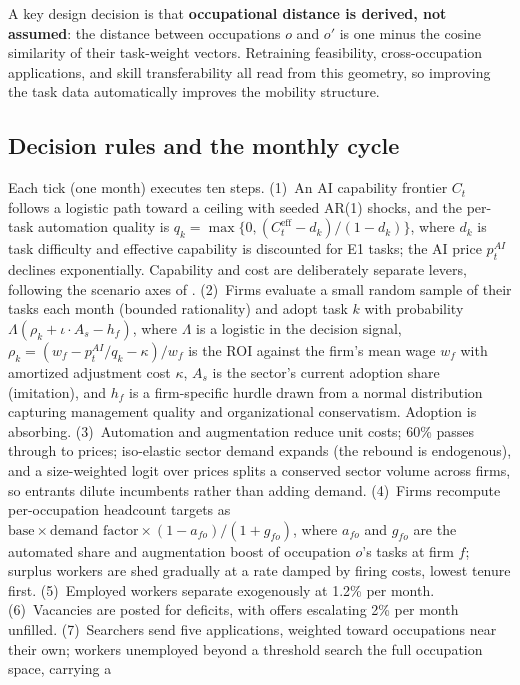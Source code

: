 \documentclass[11pt,a4paper]{article}
\begin{document}
A key design decision is that \textbf{occupational distance is derived, not assumed}:
the distance between occupations $o$ and $o'$ is one minus the cosine similarity of
their task-weight vectors. Retraining feasibility, cross-occupation applications, and
skill transferability all read from this geometry, so improving the task data
automatically improves the mobility structure.

\subsection{Decision rules and the monthly cycle}

Each tick (one month) executes ten steps. (1)~An AI capability frontier $C_t$ follows a
logistic path toward a ceiling with seeded AR(1) shocks, and the per-task automation
quality is $q_k = \max\{0, (C_t^{\text{eff}} - d_k)/(1-d_k)\}$, where $d_k$ is task
difficulty and effective capability is discounted for E1 tasks; the AI price $p^{AI}_t$
declines exponentially. Capability and cost are deliberately separate levers, following
the scenario axes of \citet{korinek2024scenarios}. (2)~Firms evaluate a small random
sample of their tasks each month (bounded rationality) and adopt task $k$ with
probability $\Lambda\!\left(\rho_k + \iota \cdot A_{s} - h_f\right)$, where
$\Lambda$ is a logistic in the decision signal, $\rho_k = (w_f - p^{AI}_t/q_k -
\kappa)/w_f$ is the ROI against the firm's mean wage $w_f$ with amortized adjustment
cost $\kappa$, $A_s$ is the sector's current adoption share (imitation), and $h_f$ is a
firm-specific hurdle drawn from a normal distribution capturing management quality and
organizational conservatism. Adoption is absorbing. (3)~Automation and augmentation
reduce unit costs; 60\% passes through to prices; iso-elastic sector demand expands
(the rebound is endogenous), and a size-weighted logit over prices splits a conserved
sector volume across firms, so entrants dilute incumbents rather than adding demand.
(4)~Firms recompute per-occupation headcount targets as
$\text{base} \times \text{demand factor} \times (1-a_{fo})/(1+g_{fo})$, where $a_{fo}$
and $g_{fo}$ are the automated share and augmentation boost of occupation $o$'s tasks at
firm $f$; surplus workers are shed gradually at a rate damped by firing costs, lowest
tenure first. (5)~Employed workers separate exogenously at 1.2\% per month.
(6)~Vacancies are posted for deficits, with offers escalating 2\% per month unfilled.
(7)~Searchers send five applications, weighted toward occupations near their own;
workers unemployed beyond a threshold search the full occupation space, carrying a
\end{document}
